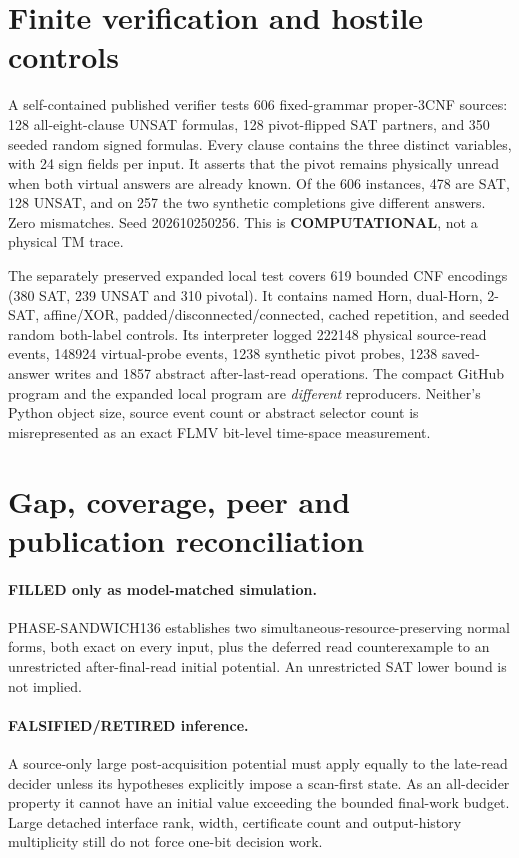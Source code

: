 \documentclass[11pt]{article}
\begin{document}
\section{Finite verification and hostile controls}
A self-contained published verifier
tests 606 fixed-grammar proper-3CNF sources:
128 all-eight-clause UNSAT formulas,
128 pivot-flipped SAT partners, and
350 seeded random signed formulas.
Every clause contains the three distinct
variables, with 24 sign fields per input.
It asserts that the pivot remains
physically unread when both virtual
answers are already known. Of the
606 instances, 478 are SAT, 128 UNSAT,
and on 257 the two synthetic completions
give different answers. Zero mismatches.
Seed 202610250256. This is
\textbf{COMPUTATIONAL}, not a physical TM trace.

The separately preserved expanded local test
covers 619 bounded CNF encodings
(380 SAT, 239 UNSAT and 310 pivotal).
It contains named Horn, dual-Horn, 2-SAT,
affine/XOR, padded/disconnected/connected,
cached repetition, and seeded random
both-label controls. Its interpreter logged
222148 physical source-read events,
148924 virtual-probe events,
1238 synthetic pivot probes,
1238 saved-answer writes and
1857 abstract after-last-read operations.
The compact GitHub program and the expanded
local program are \emph{different}
reproducers. Neither's Python object size,
source event count or abstract selector count
is misrepresented as an exact FLMV
bit-level time-space measurement.

\section{Gap, coverage, peer and publication reconciliation}
\paragraph{FILLED only as model-matched simulation.}
PHASE-SANDWICH136 establishes two
simultaneous-resource-preserving normal forms,
both exact on every input, plus the deferred
read counterexample to an unrestricted
after-final-read initial potential.
An unrestricted SAT lower bound is not implied.

\paragraph{FALSIFIED/RETIRED inference.}
A source-only large post-acquisition potential
must apply equally to the late-read
decider unless its hypotheses explicitly impose
a scan-first state. As an all-decider property it
cannot have an initial value exceeding the
bounded final-work budget. Large detached
interface rank, width, certificate count and
output-history multiplicity still do not force
one-bit decision work.
\end{document}

